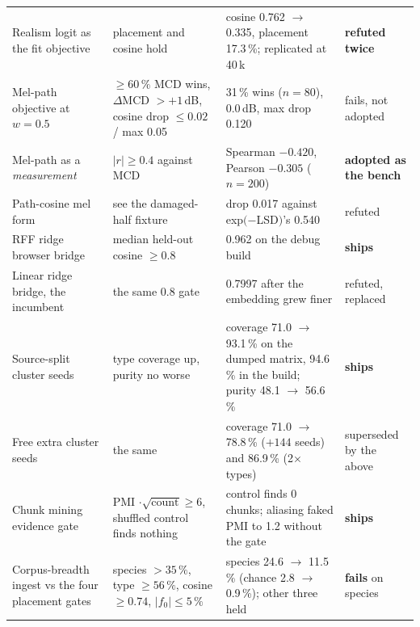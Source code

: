 \documentclass[10pt,twocolumn,a4paper]{article}
\begin{document}
\begin{longtable}{L{3.9cm} L{3.6cm} L{4.6cm} L{2.5cm}}
Realism logit as the fit objective & placement and cosine hold & cosine 0.762 $\to$ 0.335, placement 17.3\,\%; replicated at 40\,k & \textbf{refuted twice} \\
Mel-path objective at $w = 0.5$ & $\ge 60\,\%$ MCD wins, $\Delta$MCD $> +1$\,dB, cosine drop $\le 0.02$ / max 0.05 & 31\,\% wins ($n = 80$), 0.0\,dB, max drop 0.120 & fails, not adopted \\
Mel-path as a \emph{measurement} & $|r| \ge 0.4$ against MCD & Spearman $-0.420$, Pearson $-0.305$ ($n = 200$) & \textbf{adopted as the bench} \\
Path-cosine mel form & see the damaged-half fixture & drop 0.017 against exp$(-$LSD$)$'s 0.540 & refuted \\

RFF ridge browser bridge & median held-out cosine $\ge 0.8$ & 0.962 on the debug build & \textbf{ships} \\
Linear ridge bridge, the incumbent & the same 0.8 gate & 0.7997 after the embedding grew finer & refuted, replaced \\

Source-split cluster seeds & type coverage up, purity no worse & coverage 71.0 $\to$ 93.1\,\% on the dumped matrix, 94.6\,\% in the build; purity 48.1 $\to$ 56.6\,\% & \textbf{ships} \\
Free extra cluster seeds & the same & coverage 71.0 $\to$ 78.8\,\% ($+144$ seeds) and 86.9\,\% (2$\times$ types) & superseded by the above \\
Chunk mining evidence gate & PMI $\cdot \sqrt{\text{count}} \ge 6$, shuffled control finds nothing & control finds 0 chunks; aliasing faked PMI to 1.2 without the gate & \textbf{ships} \\
Corpus-breadth ingest vs the four placement gates & species $> 35\,\%$, type $\ge 56\,\%$, cosine $\ge 0.74$, $|f_0| \le 5\,\%$ & species 24.6 $\to$ 11.5\,\% (chance 2.8 $\to$ 0.9\,\%); other three held & \textbf{fails} on species \\


\end{longtable}
\end{document}
